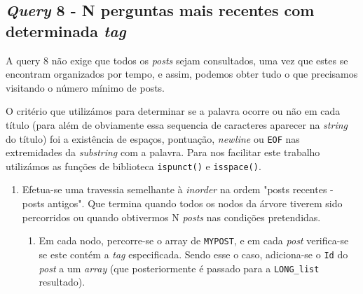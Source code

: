 \documentclass[10pt]{article}
\begin{document}
	\subsection*{\textit{Query} 8 - N perguntas mais recentes com determinada \textit{tag}}
			A query 8 não exige que todos os \textit{posts} sejam consultados,
		uma vez que estes se encontram organizados por tempo, e assim, podemos obter tudo o que 				precisamos visitando o número	mínimo de posts.
		
			O critério que utilizámos para determinar se a palavra ocorre ou não em cada
		título (para além de obviamente essa sequencia de caracteres aparecer na \textit{string}
		do título) foi a existência de espaços, pontuação, \textit{newline} ou \texttt{EOF}
		nas extremidades da \textit{substring} com a palavra. Para nos facilitar este trabalho
		utilizámos as funções de biblioteca \texttt{ispunct()} e \texttt{isspace()}.
			\begin{enumerate}
				\item Efetua-se uma travessia semelhante à \textit{inorder} na ordem
					"posts recentes - posts antigos". Que termina quando todos os
					nodos da árvore tiverem sido percorridos ou quando obtivermos N
					\textit{posts} nas condições pretendidas.
					\begin{enumerate}
						\item	Em cada nodo, percorre-se o array de \texttt{MYPOST}, e em cada 
						\textit{post} verifica-se se este contém a \textit{tag} especificada.
						Sendo esse o caso, adiciona-se o \texttt{Id} do \textit{post} a um
						\textit{array} (que posteriormente é passado para a \texttt{LONG\_list} 
						resultado).
					\end{enumerate}
			\end{enumerate}
\end{document}
